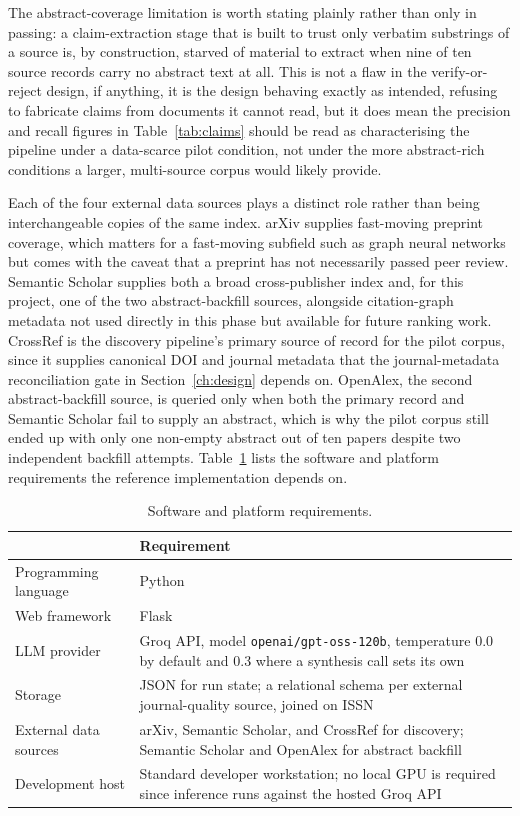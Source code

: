 \documentclass[12pt,a4paper]{report}
\newcommand{\headrow}{\rowcolor{navy}}
\newcommand{\hd}[1]{{\color{white}\bfseries #1}}
\begin{document}
The abstract-coverage limitation is worth stating plainly rather than only
in passing: a claim-extraction stage that is built to trust only verbatim
substrings of a source is, by construction, starved of material to extract
when nine of ten source records carry no abstract text at all. This is not a
flaw in the verify-or-reject design, if anything, it is the design behaving
exactly as intended, refusing to fabricate claims from documents it cannot
read, but it does mean the precision and recall figures in
Table~\ref{tab:claims} should be read as characterising the pipeline under a
data-scarce pilot condition, not under the more abstract-rich conditions a
larger, multi-source corpus would likely provide.

Each of the four external data sources plays a distinct role rather than
being interchangeable copies of the same index. arXiv supplies fast-moving
preprint coverage, which matters for a fast-moving subfield such as graph
neural networks but comes with the caveat that a preprint has not necessarily
passed peer review. Semantic Scholar supplies both a broad cross-publisher
index and, for this project, one of the two abstract-backfill sources,
alongside citation-graph metadata not used directly in this phase but
available for future ranking work. CrossRef is the discovery pipeline's
primary source of record for the pilot corpus, since it supplies canonical
DOI and journal metadata that the journal-metadata reconciliation gate in
Section~\ref{ch:design} depends on. OpenAlex, the second abstract-backfill
source, is queried only when both the primary record and Semantic Scholar
fail to supply an abstract, which is why the pilot corpus still ended up with
only one non-empty abstract out of ten papers despite two independent
backfill attempts. Table~\ref{tab:reqs} lists the software and platform
requirements the reference implementation depends on.

\begin{table}[H]
\centering
\caption{Software and platform requirements.}
\label{tab:reqs}
\begin{tabular}{@{}p{4.4cm}p{9.0cm}@{}}
\toprule
\headrow \hd{Component} & \hd{Requirement} \\
\midrule
Programming language & Python \\
Web framework & Flask \\
LLM provider & Groq API, model \texttt{openai/gpt-oss-120b}, temperature 0.0 by
default and 0.3 where a synthesis call sets its own \\
Storage & JSON for run state; a relational schema per external journal-quality
source, joined on ISSN \\
External data sources & arXiv, Semantic Scholar, and CrossRef for discovery;
Semantic Scholar and OpenAlex for abstract backfill \\
Development host & Standard developer workstation; no local GPU is required
since inference runs against the hosted Groq API \\
\bottomrule
\end{tabular}
\end{table}
\end{document}
